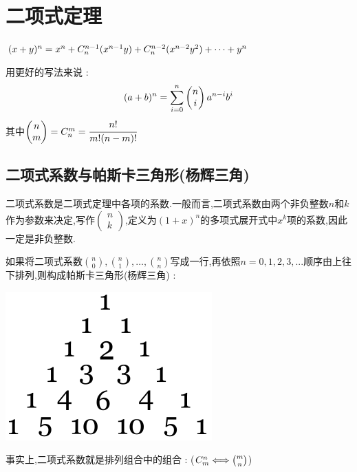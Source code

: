 {\section{二项式定理}{
  $(x + y)^n = x^n + \mathCombination{n}{n-1}(x^{n-1} y) + \mathCombination{n}{n-2}(x^{n-2} y^2) + \dots + y^n$

  用更好的写法来说 : $$
      (a + b)^n = \upDownSum{n}{i = 0}\begin{pmatrix}
          n \\
          i
      \end{pmatrix}
      a^{n - i}b^i
  $$
  其中$\begin{pmatrix}
          n \\
          m
      \end{pmatrix}
      =
      \mathCombination{n}{m}
      =
      \cfrac{n!}{m!(n - m)!}$

  \subsection{二项式系数与帕斯卡三角形(杨辉三角)}{

      二项式系数是二项式定理中各项的系数.一般而言,二项式系数由两个非负整数$n$和$k$作为参数来决定,写作$\begin{pmatrix}
              n \\
              k
          \end{pmatrix}$,定义为$(1 + x)^n$的多项式展开式中$x^k$项的系数,因此一定是非负整数.

      如果将二项式系数$\binom{n}{0},\binom{n}{1},\dots,\binom{n}{n}$写成一行,再依照$n = 0,1,2,3,...$顺序由上往下排列,则构成帕斯卡三角形(杨辉三角) :
      \begin{center}
          \includegraphics[scale=0.5]{resources/Pascal's_triangle_5.svg.png}
      \end{center}

      事实上,二项式系数就是排列组合中的组合 : ($\mathCombination{m}{n} \Longleftrightarrow \binom{m}{n}$)

}}}
